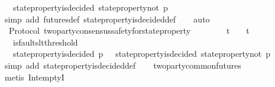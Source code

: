 \begin{isabellebody}
\ \ {\isasymlongrightarrow}\ {\isasymnot}state{\isacharunderscore}property{\isacharunderscore}is{\isacharunderscore}decided\ {\isacharparenleft}state{\isacharunderscore}property{\isacharunderscore}not\ p{\isacharcomma}\ {\isasymsigma}{\isacharparenright}{\isachardoublequoteclose}\isanewline
%
\isadelimproof
\ \ %
\endisadelimproof
%
\isatagproof
{}\isamarkupfalse%
\ {\isacharparenleft}simp\ add{\isacharcolon}\ futures{\isacharunderscore}def\ state{\isacharunderscore}property{\isacharunderscore}is{\isacharunderscore}decided{\isacharunderscore}def{\isacharparenright}\isanewline
\ \ \isamarkupfalse%
\ auto%
\endisatagproof
{\isafoldproof}%
%
\isadelimproof
\isanewline
%
\endisadelimproof
\ \ \isanewline
\isanewline
{}\isamarkupfalse%
\ {\isacharparenleft}\ Protocol{\isacharparenright}\ two{\isacharunderscore}party{\isacharunderscore}consensus{\isacharunderscore}safety{\isacharunderscore}for{\isacharunderscore}state{\isacharunderscore}property\ {\isacharcolon}\isanewline
\ \ {\isachardoublequoteopen}{\isasymforall}\ {\isasymsigma}{}\ {\isasymsigma}{}{\isachardot}\ {\isasymsigma}{}\ {\isasymin}\ {\isasymSigma}t\ {\isasymand}\ {\isasymsigma}{}\ {\isasymin}\ {\isasymSigma}t\isanewline
\ \ {\isasymlongrightarrow}\ is{\isacharunderscore}faults{\isacharunderscore}lt{\isacharunderscore}threshold\ {\isacharparenleft}{\isasymsigma}{}\ {\isasymunion}\ {\isasymsigma}{}{\isacharparenright}\isanewline
\ \ {\isasymlongrightarrow}\ {\isasymnot}{\isacharparenleft}state{\isacharunderscore}property{\isacharunderscore}is{\isacharunderscore}decided\ {\isacharparenleft}p{\isacharcomma}\ {\isasymsigma}{}{\isacharparenright}\ {\isasymand}\ state{\isacharunderscore}property{\isacharunderscore}is{\isacharunderscore}decided\ {\isacharparenleft}state{\isacharunderscore}property{\isacharunderscore}not\ p{\isacharcomma}\ {\isasymsigma}{}{\isacharparenright}{\isacharparenright}{\isachardoublequoteclose}\isanewline
%
\isadelimproof
\ \ %
\endisadelimproof
%
\isatagproof
{}\isamarkupfalse%
\ {\isacharparenleft}simp\ add{\isacharcolon}\ state{\isacharunderscore}property{\isacharunderscore}is{\isacharunderscore}decided{\isacharunderscore}def{\isacharparenright}\isanewline
\ \ \isamarkupfalse%
\ two{\isacharunderscore}party{\isacharunderscore}common{\isacharunderscore}futures\isanewline
\ \ \isamarkupfalse%
\ {\isacharparenleft}metis\ Int{\isacharunderscore}emptyI{\isacharparenright}%
\endisatagproof

\end{isabellebody}
